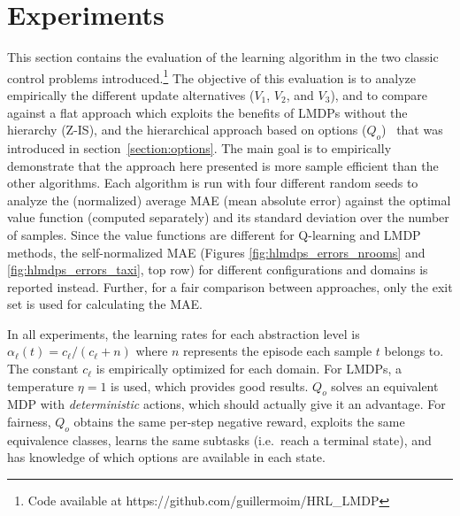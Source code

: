\section{Experiments}
\label{section:hlmdps_experiments}
This section contains the evaluation of the learning algorithm in the two classic control problems introduced.\footnote{Code available at https://github.com/guillermoim/HRL\_LMDP}
The objective of this evaluation is to analyze empirically the different update alternatives ($V_1$, $V_2$, and $V_3$), and
to compare against a flat approach which exploits the benefits of LMDPs without the hierarchy (Z-IS), and the hierarchical approach based on options ($Q_o$)~\citep{Sutton1999} that was introduced in section~\ref{section:options}. The main goal is to empirically demonstrate that the approach here presented is more sample efficient than the other algorithms. Each algorithm is run with four different random seeds to analyze the (normalized) average MAE (mean absolute error) against the optimal value function (computed separately) and its standard deviation over the number of samples. Since the value functions are different for Q-learning and LMDP methods, the self-normalized MAE (Figures \ref{fig:hlmdps_errors_nrooms} and \ref{fig:hlmdps_errors_taxi}, top row) for different configurations and domains is reported instead. Further, for a fair comparison between approaches, only the exit set is used for calculating the MAE.


In all experiments, the learning rates for each abstraction level is $\alpha_\ell(t) = c_\ell / (c_\ell + n)$ where $n$ represents the episode each sample $t$ belongs to. The constant $c_\ell$ is empirically optimized for each domain. For LMDPs, a temperature $\eta=1$ is used, which provides good results. $Q_o$ solves an equivalent MDP with {\em deterministic} actions, which should actually give it an advantage. For fairness, $Q_o$ obtains the same per-step negative reward, exploits the same equivalence classes, learns the same subtasks (i.e.~reach a terminal state), and has knowledge of which options are available in each state.

